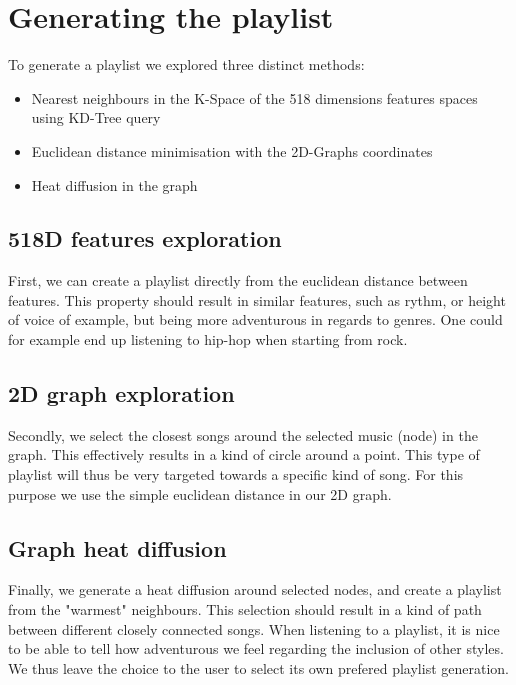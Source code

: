 \section{Generating the playlist}

To generate a playlist we explored three distinct methods:
\begin{itemize}
\item Nearest neighbours in the K-Space of the 518 dimensions features spaces using KD-Tree query
\item Euclidean distance minimisation with the 2D-Graphs coordinates
\item Heat diffusion in the graph
\end{itemize}

\subsection{518D features exploration}
First, we can create a playlist directly from the euclidean distance between features. This property should result in similar features, such as rythm, or height of voice of example, but being more adventurous in regards to genres. One could for example end up listening to hip-hop when starting from rock.

\subsection{2D graph exploration}
Secondly, we select the closest songs around the selected music (node) in the graph. This effectively results in a kind of circle around a point. This type of playlist will thus be very targeted towards a specific kind of song. For this purpose we use the simple euclidean distance in our 2D graph.

\subsection{Graph heat diffusion}
Finally, we generate a heat diffusion around selected nodes, and create a playlist from the "warmest" neighbours. This selection should result in a kind of path between different closely connected songs. 
When listening to a playlist, it is nice to be able to tell how adventurous we feel regarding the inclusion of other styles. We thus leave the choice to the user to select its own prefered playlist generation.



\begin{figure}[h!]
  \centering
  \caption{}
  \label{fig:}
\end{figure}

